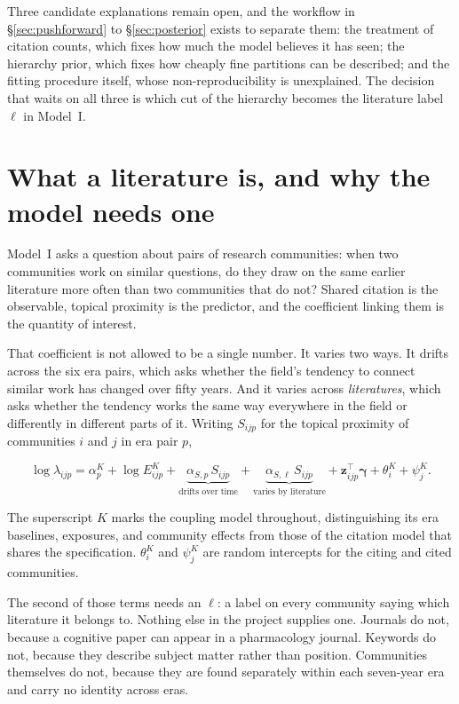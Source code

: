 \documentclass[11pt]{article}
\begin{document}
Three candidate explanations remain open, and the workflow in
\S\ref{sec:pushforward} to \S\ref{sec:posterior} exists to separate them: the
treatment of citation counts, which fixes how much the model believes it has
seen; the hierarchy prior, which fixes how cheaply fine partitions can be
described; and the fitting procedure itself, whose non-reproducibility is
unexplained. The decision that waits on all three is which cut of the hierarchy
becomes the literature label $\ell$ in Model~I.

\section{What a literature is, and why the model needs one}

Model~I asks a question about pairs of research communities: when two
communities work on similar questions, do they draw on the same earlier
literature more often than two communities that do not? Shared citation is the
observable, topical proximity is the predictor, and the coefficient linking them
is the quantity of interest.

That coefficient is not allowed to be a single number. It varies two ways. It
drifts across the six era pairs, which asks whether the field's tendency to
connect similar work has changed over fifty years. And it varies across
\emph{literatures}, which asks whether the tendency works the same way
everywhere in the field or differently in different parts of it. Writing
$S_{ijp}$ for the topical proximity of communities $i$ and $j$ in era pair $p$,

\begin{equation}
\log \lambda_{ijp} = \alpha^{K}_{p} + \log E^{K}_{ijp}
  + \underbrace{\alpha_{S,p}\, S_{ijp}}_{\text{drifts over time}}
  + \underbrace{\alpha_{S,\ell}\, S_{ijp}}_{\text{varies by literature}}
  + \bm{z}_{ijp}^{\top}\bm{\gamma} + \theta^{K}_{i} + \psi^{K}_{j}.
\end{equation}

The superscript $K$ marks the coupling model throughout, distinguishing its
era baselines, exposures, and community effects from those of the citation
model that shares the specification. $\theta^{K}_{i}$ and $\psi^{K}_{j}$ are
random intercepts for the citing and cited communities.

The second of those terms needs an $\ell$: a label on every community saying
which literature it belongs to. Nothing else in the project supplies one.
Journals do not, because a cognitive paper can appear in a pharmacology journal.
Keywords do not, because they describe subject matter rather than position.
Communities themselves do not, because they are found separately within each
seven-year era and carry no identity across eras.
\end{document}
